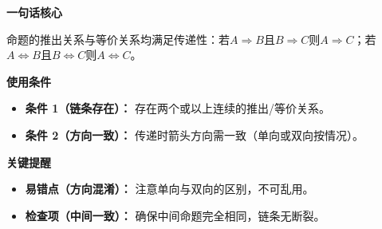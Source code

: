 \begin{summarybox}
	\textbf{\textcolor{CSummary}{一句话核心}}

	命题的推出关系与等价关系均满足传递性：若$A\Rightarrow B$且$B\Rightarrow C$则$A\Rightarrow C$；若$A\Leftrightarrow B$且$B\Leftrightarrow C$则$A\Leftrightarrow C$。

	\medskip
	\textbf{\textcolor{CSummary}{使用条件}}
	\begin{itemize}[leftmargin=*, itemsep=0.5em, topsep=0.4em]
		\item \textbf{条件 1（链条存在）：} 存在两个或以上连续的推出/等价关系。
		\item \textbf{条件 2（方向一致）：} 传递时箭头方向需一致（单向或双向按情况）。
	\end{itemize}

	\medskip
	\textbf{\textcolor{CSummary}{关键提醒}}
	\begin{itemize}[leftmargin=*, itemsep=0.5em, topsep=0.4em]
		\item \textbf{易错点（方向混淆）：} 注意单向与双向的区别，不可乱用。
		\item \textbf{检查项（中间一致）：} 确保中间命题完全相同，链条无断裂。
	\end{itemize}
\end{summarybox}
